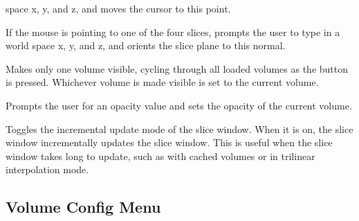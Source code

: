 \begin{description}
       space x, y, and z, and moves the cursor to this point.
\item[\menutwo{Slice}{Type In Plane Normal}]  If the mouse is pointing to
       one of the four slices, prompts the user to type in a world
       space x, y, and z, and orients the slice plane to this normal.
\item[\menutwo{Slice}{Visible:}]  Makes only one volume visible, cycling
       through all loaded volumes as the button is pressed.  Whichever volume
       is made visible is set to the current volume.
\item[\menutwo{Slice}{Vol Opacity:}]  Prompts the user for an opacity
       value and sets the opacity of the current volume.
\item[\menutwo{Slice}{Increm Update:}]  Toggles the incremental
       update mode of the slice window.  When it is on, the slice
       window incrementally updates the slice window.  This is useful
       when the slice window takes long to update, such as with cached
       volumes or in trilinear interpolation mode.
\end{description}

\subsection{Volume Config Menu}


